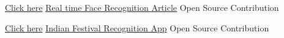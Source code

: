 

\begin{cventries}


  \cventry
    {\href{https://www.linkedin.com/pulse/real-time-face-recognition-using-facenet-ishwar-sawale/}{Click here}} %
    {\href{https://www.linkedin.com/pulse/real-time-face-recognition-using-facenet-ishwar-sawale/}{Real time Face Recognition Article}} %
    {Open Source Contribution} %
    {} %
    {
      \begin{cvitems} %
      \end{cvitems}
    }

  \cventry
    {\href{https://goo.gl/LhiUZF}{Click here}} %
    {\href{https://goo.gl/LhiUZF}{Indian Festival Recognition App}} %
    {Open Source Contribution} %
    {} %
    {
      \begin{cvitems} %
      \end{cvitems}
    }


\end{cventries}
